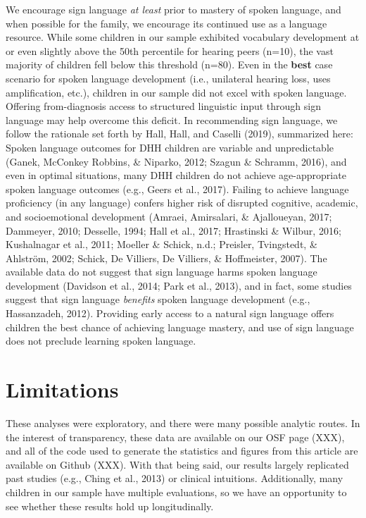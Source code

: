 \documentclass[
  english,
  man]{apa6}
\begin{document}
We encourage sign language \emph{at least} prior to mastery of spoken language, and when possible for the family, we encourage its continued use as a language resource. While some children in our sample exhibited vocabulary development at or even slightly above the 50th percentile for hearing peers (n=10), the vast majority of children fell below this threshold (n=80). Even in the \textbf{best} case scenario for spoken language development (i.e., unilateral hearing loss, uses amplification, etc.), children in our sample did not excel with spoken language. Offering from-diagnosis access to structured linguistic input through sign language may help overcome this deficit. In recommending sign language, we follow the rationale set forth by Hall, Hall, and Caselli (2019), summarized here: Spoken language outcomes for DHH children are variable and unpredictable (Ganek, McConkey Robbins, \& Niparko, 2012; Szagun \& Schramm, 2016), and even in optimal situations, many DHH children do not achieve age-appropriate spoken language outcomes (e.g., Geers et al., 2017). Failing to achieve language proficiency (in any language) confers higher risk of disrupted cognitive, academic, and socioemotional development (Amraei, Amirsalari, \& Ajalloueyan, 2017; Dammeyer, 2010; Desselle, 1994; Hall et al., 2017; Hrastinski \& Wilbur, 2016; Kushalnagar et al., 2011; Moeller \& Schick, n.d.; Preisler, Tvingstedt, \& Ahlström, 2002; Schick, De Villiers, De Villiers, \& Hoffmeister, 2007). The available data do not suggest that sign language harms spoken language development (Davidson et al., 2014; Park et al., 2013), and in fact, some studies suggest that sign language \emph{benefits} spoken language development (e.g., Hassanzadeh, 2012). Providing early access to a natural sign language offers children the best chance of achieving language mastery, and use of sign language does not preclude learning spoken language.

\hypertarget{limitations}{%
\section{Limitations}\label{limitations}}

These analyses were exploratory, and there were many possible analytic routes. In the interest of transparency, these data are available on our OSF page (XXX), and all of the code used to generate the statistics and figures from this article are available on Github (XXX). With that being said, our results largely replicated past studies (e.g., Ching et al., 2013) or clinical intuitions. Additionally, many children in our sample have multiple evaluations, so we have an opportunity to see whether these results hold up longitudinally.
\end{document}

